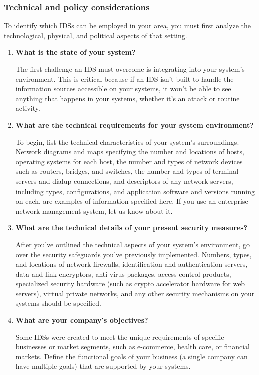\documentclass[12pt]{article}
\begin{document}
    \subsubsection{Technical and policy considerations}
    \par To identify which IDSs can be employed in your area, you must first analyze the technological, physical, and political aspects of that setting.
    \clearpage
    \begin{enumerate}
        \item \textbf{What is the state of your system?}
        \par The first challenge an IDS must overcome is integrating into your system's environment. This is critical because if an IDS isn't built to handle the information sources accessible on your systems, it won't be able to see anything that happens in your systems, whether it's an attack or routine activity.
        \item \textbf{What are the technical requirements for your system environment?}
        \par To begin, list the technical characteristics of your system's surroundings. Network diagrams and maps specifying the number and locations of hosts, operating systems for each host, the number and types of network devices such as routers, bridges, and switches, the number and types of terminal servers and dialup connections, and descriptors of any network servers, including types, configurations, and application software and versions running on each, are examples of information specified here. If you use an enterprise network management system, let us know about it.
        
        \item \textbf{What are the technical details of your present security measures?}
        \par After you've outlined the technical aspects of your system's environment, go over the security safeguards you've previously implemented. Numbers, types, and locations of network firewalls, identification and authentication servers, data and link encryptors, anti-virus packages, access control products, specialized security hardware (such as crypto accelerator hardware for web servers), virtual private networks, and any other security mechanisms on your systems should be specified.
        
        \item \textbf{What are your company's objectives?}
        \par Some IDSs were created to meet the unique requirements of specific businesses or market segments, such as e-commerce, health care, or financial markets. Define the functional goals of your business (a single company can have multiple goals) that are supported by your systems.
        

\end{enumerate}
\end{document}
